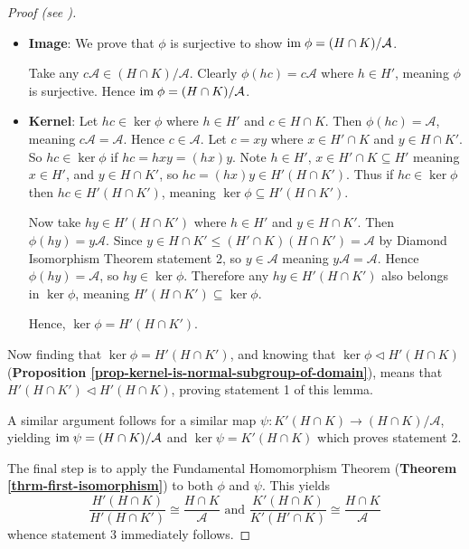\begin{proof}[Proof (see {\cite[p.~110]{hungerford_1980}})]
\begin{itemize}
        \item \textbf{Image}: We prove that $\phi$ is surjective to show $\mathrm{im}\; \phi = (H\cap K)/\mathcal{A}$.
        
        Take any $c\mathcal{A} \in (H\cap K) / \mathcal{A}$. Clearly $\phi(hc) = c\mathcal{A}$ where $h \in H'$, meaning $\phi$ is surjective. Hence $\mathrm{im}\; \phi = (H\cap K)/\mathcal{A}$.
        
        \item \textbf{Kernel}: Let $hc \in \ker\phi$ where $h \in H'$ and $c \in H \cap K$. Then $\phi(hc) = \mathcal{A}$, meaning $c\mathcal{A} = \mathcal{A}$. Hence $c \in \mathcal{A}$. Let $c = xy$ where $x \in H'\cap K$ and $y \in H \cap K'$. So $hc \in \ker\phi$ if $hc = hxy = (hx)y$. Note $h \in H'$, $x \in H' \cap K \subseteq H'$ meaning $x \in H'$, and $y \in H \cap K'$, so $hc = (hx)y \in H'(H \cap K')$. Thus if $hc \in \ker\phi$ then $hc \in H'(H \cap K')$, meaning $\ker\phi \subseteq H'(H \cap K')$.
        
        Now take $hy \in H'(H \cap K')$ where $h \in H'$ and $y \in H \cap K'$. Then $\phi(hy) = y\mathcal{A}$. Since $y \in H \cap K' \leq (H' \cap K)(H \cap K') = \mathcal{A}$ by Diamond Isomorphism Theorem statement 2, so $y \in \mathcal{A}$ meaning $y\mathcal{A} = \mathcal{A}$. Hence $\phi(hy) = \mathcal{A}$, so $hy \in \ker\phi$. Therefore any $hy \in H'(H \cap K')$ also belongs in $\ker\phi$, meaning $H'(H \cap K') \subseteq \ker\phi$.
        
        Hence, $\ker\phi = H'(H \cap K')$.
    \end{itemize}
    
    Now finding that $\ker\phi = H'(H \cap K')$, and knowing that $\ker\phi \lhd H'(H\cap K)$ (\textbf{Proposition \ref{prop-kernel-is-normal-subgroup-of-domain}}), means that $H'(H \cap K') \lhd H'(H\cap K)$, proving statement 1 of this lemma.
    
    A similar argument follows for a similar map $\psi: K'(H\cap K) \to (H\cap K)/\mathcal{A}$, yielding $\mathrm{im}\;\psi = (H\cap K)/\mathcal{A}$ and $\ker\psi = K'(H\cap K)$ which proves statement 2.
    
    The final step is to apply the Fundamental Homomorphism Theorem (\textbf{Theorem \ref{thrm-first-isomorphism}}) to both $\phi$ and $\psi$. This yields
    \[
        \frac{H'(H\cap K)}{H'(H\cap K')} \cong \frac{H\cap K}{\mathcal{A}} 
        \text{ and }
        \frac{K'(H\cap K)}{K'(H'\cap K)} \cong \frac{H\cap K}{\mathcal{A}}
    \]
    whence statement 3 immediately follows.
\end{proof}

